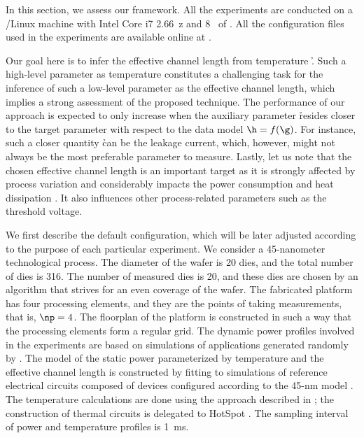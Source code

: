 In this section, we assess our framework. All the experiments are conducted on a
/Linux machine with Intel Core i7 2.66~z and 8~ of
. All the configuration files used in the experiments are available
online at \cite{eslab2014a}.

Our goal here is to infer the effective channel length \g from temperature \h.
Such a high-level parameter as temperature constitutes a challenging task for
the inference of such a low-level parameter as the effective channel length,
which implies a strong assessment of the proposed technique. The performance of
our approach is expected to only increase when the auxiliary parameter \h
resides closer to the target parameter \g with respect to the data model $\h =
f(\g)$. For instance, such a closer quantity \h can be the leakage current,
which, however, might not always be the most preferable parameter to measure.
Lastly, let us note that the chosen effective channel length is an important
target as it is strongly affected by process variation and considerably impacts
the power consumption and heat dissipation \cite{chandrakasan2000,
srivastava2010, juan2011, juan2012}. It also influences other process-related
parameters such as the threshold voltage.

We first describe the default configuration, which will be later adjusted
according to the purpose of each particular experiment. We consider a
45-nanometer technological process. The diameter of the wafer is 20 dies, and
the total number of dies \nd is 316. The number of measured dies \hnd is 20, and
these dies are chosen by an algorithm that strives for an even coverage of the
wafer. The fabricated platform has four processing elements, and they are the
points of taking measurements, that is, $\np = 4$. The floorplan of the platform
is constructed in such a way that the processing elements form a regular grid.
The dynamic power profiles involved in the experiments are based on simulations
of applications generated randomly by  \cite{dick1998}. The model of
the static power parameterized by temperature and the effective channel length
is constructed by fitting to  simulations of reference electrical
circuits composed of  devices \cite{bsim} configured according to the
45-nm   model \cite{ptm}. The temperature calculations are done
using the approach described in ; the
construction of thermal  circuits is delegated to HotSpot
\cite{skadron2003}. The sampling interval of power and temperature profiles is
1~ms.

